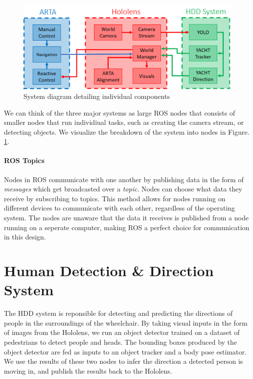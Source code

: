 \begin{figure}[ht]
	\centering
	\includegraphics[width=1.0\linewidth]{img/chapter4_analysis/detailedSystemDiagram.png}
	\caption{System diagram detailing individual components}
	\label{fig:detailedHL}
\end{figure}

We can think of the three major systems as large ROS nodes that consists of smaller nodes that run individiual tasks, such as creating the camera stream, or detecting objects. We visualize the breakdown of the system into nodes in Figure. \ref{fig:detailedHL}.

\paragraph{ROS Topics} Nodes in ROS communicate with one another by publishing data in the form of \textit{messages} which get broadcasted over a \textit{topic}. Nodes can choose what data they receive by subscribing to topics. This method allows for nodes running on different devices to communicate with each other, regardless of the operating system. The nodes are unaware that the data it receives is published from a node running on a seperate computer, making ROS a perfect choice for communication in this design.

\section{Human Detection \& Direction System}
The HDD system is reponsible for detecting and predicting the directions of people in the surroundings of the wheelchair. By taking visual inputs in the form of images from the Hololens, we run an object detector trained on a dataset of pedestrians to detect people and heads. The bounding boxes produced by the object detector are fed as inputs to an object tracker and a body pose estimator. We use the results of these two nodes to infer the direction a detected person is moving in, and publish the results back to the Hololens.

